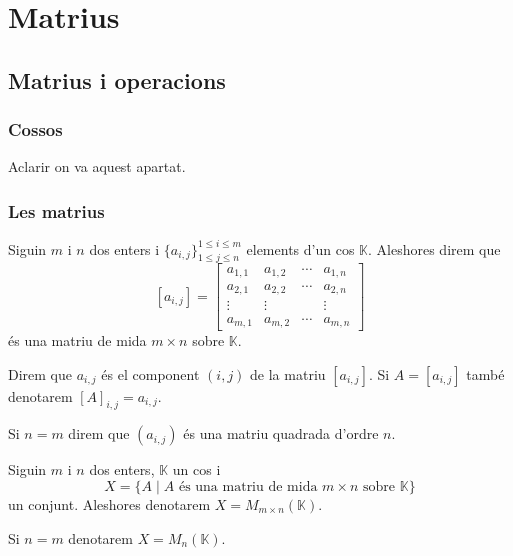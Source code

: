 \documentclass[../Apunts.tex]{subfiles}
\begin{document}
\chapter{Matrius}
	\section{Matrius i operacions}
	\subsection{Cossos}
	\begin{definition}[Cos]
		\label{def:cos}
		Aclarir on va aquest apartat.
	\end{definition}
	\subsection{Les matrius}
	\begin{definition}[Matriu]
		\label{def:matriu}
		\label{def:matriu quadrada}
		Siguin \(m\) i \(n\) dos enters i \(\{a_{i,j}\}^{1\leq i\leq m}_{1\leq j\leq n}\) elements d'un cos \(\mathbb{K}\). Aleshores direm que
		\[[a_{i,j}]=
		\left[\begin{matrix}
		a_{1,1} & a_{1,2} & \cdots & a_{1,n} \\
		a_{2,1} & a_{2,2} & \cdots & a_{2,n} \\
		\vdots & \vdots &  & \vdots \\
		a_{m,1} & a_{m,2} & \cdots & a_{m,n}
		\end{matrix}\right]\]
		és una matriu de mida \(m\times n\) sobre \(\mathbb{K}\).
		
		Direm que \(a_{i,j}\) és el component \((i,j)\) de la matriu \([a_{i,j}]\). Si \(A=[a_{i,j}]\) també denotarem \([A]_{i,j}=a_{i,j}\).
		
		Si \(n=m\) direm que \((a_{i,j})\) és una matriu quadrada d'ordre \(n\).
	\end{definition}
	\begin{notation}
		\label{notation:conjunt de matrius}
		Siguin \(m\) i \(n\) dos enters, \(\mathbb{K}\) un cos i
		\[X=\{A\mid A\text{ és una matriu de mida }m\times n\text{ sobre }\mathbb{K}\}\]
		un conjunt. Aleshores denotarem \(X=M_{m\times n}(\mathbb{K})\).
		
		Si \(n=m\) denotarem \(X=M_{n}(\mathbb{K})\).
	\end{notation}
\end{document}
